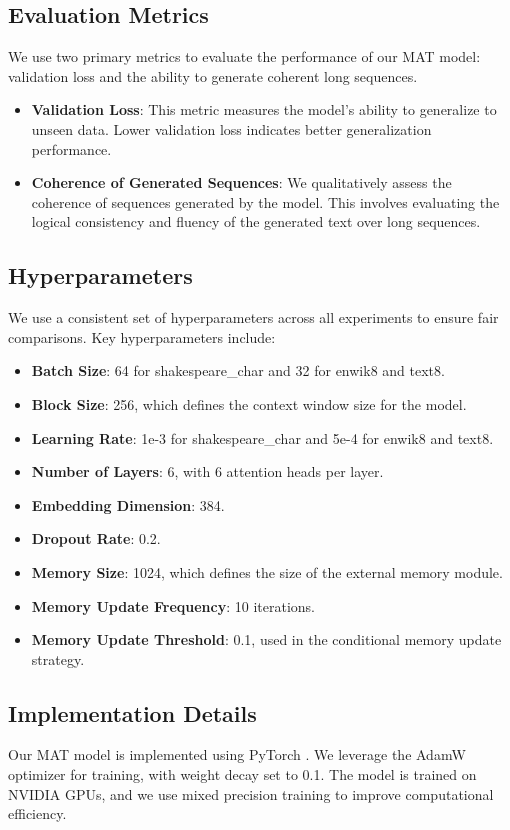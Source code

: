 \documentclass{article} %
\begin{document}
\subsection{Evaluation Metrics}
We use two primary metrics to evaluate the performance of our MAT model: validation loss and the ability to generate coherent long sequences.

\begin{itemize}
    \item \textbf{Validation Loss}: This metric measures the model's ability to generalize to unseen data. Lower validation loss indicates better generalization performance.
    \item \textbf{Coherence of Generated Sequences}: We qualitatively assess the coherence of sequences generated by the model. This involves evaluating the logical consistency and fluency of the generated text over long sequences.
\end{itemize}

\subsection{Hyperparameters}
We use a consistent set of hyperparameters across all experiments to ensure fair comparisons. Key hyperparameters include:

\begin{itemize}
    \item \textbf{Batch Size}: 64 for shakespeare\_char and 32 for enwik8 and text8.
    \item \textbf{Block Size}: 256, which defines the context window size for the model.
    \item \textbf{Learning Rate}: 1e-3 for shakespeare\_char and 5e-4 for enwik8 and text8.
    \item \textbf{Number of Layers}: 6, with 6 attention heads per layer.
    \item \textbf{Embedding Dimension}: 384.
    \item \textbf{Dropout Rate}: 0.2.
    \item \textbf{Memory Size}: 1024, which defines the size of the external memory module.
    \item \textbf{Memory Update Frequency}: 10 iterations.
    \item \textbf{Memory Update Threshold}: 0.1, used in the conditional memory update strategy.
\end{itemize}

\subsection{Implementation Details}
Our MAT model is implemented using PyTorch \citep{paszke2019pytorch}. We leverage the AdamW optimizer \citep{loshchilov2017adamw} for training, with weight decay set to 0.1. The model is trained on NVIDIA GPUs, and we use mixed precision training to improve computational efficiency.
\end{document}
